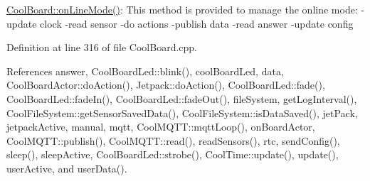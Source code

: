 \hyperlink{class_cool_board_aa0bbc4bc605e35618d18e68795c61363}{Cool\+Board\+::on\+Line\+Mode()}\+: This method is provided to manage the online mode\+: -\/update clock -\/read sensor -\/do actions -\/publish data -\/read answer -\/update config 

Definition at line 316 of file Cool\+Board.\+cpp.



References answer, Cool\+Board\+Led\+::blink(), cool\+Board\+Led, data, Cool\+Board\+Actor\+::do\+Action(), Jetpack\+::do\+Action(), Cool\+Board\+Led\+::fade(), Cool\+Board\+Led\+::fade\+In(), Cool\+Board\+Led\+::fade\+Out(), file\+System, get\+Log\+Interval(), Cool\+File\+System\+::get\+Sensor\+Saved\+Data(), Cool\+File\+System\+::is\+Data\+Saved(), jet\+Pack, jetpack\+Active, manual, mqtt, Cool\+M\+Q\+T\+T\+::mqtt\+Loop(), on\+Board\+Actor, Cool\+M\+Q\+T\+T\+::publish(), Cool\+M\+Q\+T\+T\+::read(), read\+Sensors(), rtc, send\+Config(), sleep(), sleep\+Active, Cool\+Board\+Led\+::strobe(), Cool\+Time\+::update(), update(), user\+Active, and user\+Data().

